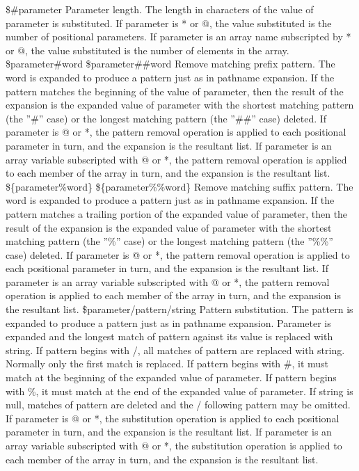\${\#parameter}
Parameter length. The length in characters of the value of parameter is substituted. If parameter is * or @, the value substituted is the number of positional parameters. If parameter is an array name subscripted by * or @, the value substituted is the number of elements in the array.
\${parameter\#word}
\${parameter\#\#word}
Remove matching prefix pattern. The word is expanded to produce a pattern just as in pathname expansion. If the pattern matches the beginning of the value of parameter, then the result of the expansion is the expanded value of parameter with the shortest matching pattern (the ''\#'' case) or the longest matching pattern (the ''\#\#'' case) deleted. If parameter is @ or *, the pattern removal operation is applied to each positional parameter in turn, and the expansion is the resultant list. If parameter is an array variable subscripted with @ or *, the pattern removal operation is applied to each member of the array in turn, and the expansion is the resultant list.
\$\{parameter\%word\}
\$\{parameter\%\%word\}
Remove matching suffix pattern. The word is expanded to produce a pattern just as in pathname expansion. If the pattern matches a trailing portion of the expanded value of parameter, then the result of the expansion is the expanded value of parameter with the shortest matching pattern (the ''\%'' case) or the longest matching pattern (the ''\%\%'' case) deleted. If parameter is @ or *, the pattern removal operation is applied to each positional parameter in turn, and the expansion is the resultant list. If parameter is an array variable subscripted with @ or *, the pattern removal operation is applied to each member of the array in turn, and the expansion is the resultant list.
\${parameter/pattern/string}
Pattern substitution. The pattern is expanded to produce a pattern just as in pathname expansion. Parameter is expanded and the longest match of pattern against its value is replaced with string. If pattern begins with /, all matches of pattern are replaced with string. Normally only the first match is replaced. If pattern begins with \#, it must match at the beginning of the expanded value of parameter. If pattern begins with \%, it must match at the end of the expanded value of parameter. If string is null, matches of pattern are deleted and the / following pattern may be omitted. If parameter is @ or *, the substitution operation is applied to each positional parameter in turn, and the expansion is the resultant list. If parameter is an array variable subscripted with @ or *, the substitution operation is applied to each member of the array in turn, and the expansion is the resultant list.
